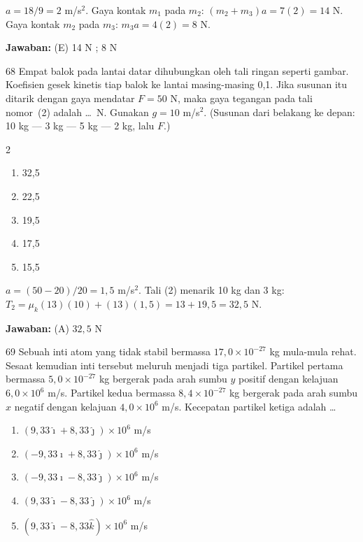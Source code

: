 \documentclass[11pt]{article}
\newenvironment{pil}{%
  \begin{enumerate}[label=(\Alph*),leftmargin=*,itemsep=1pt,topsep=3pt]}%
  {\end{enumerate}}
\newenvironment{pilB}{%
  \par\smallskip\begin{multicols}{2}
  \begin{enumerate}[label=(\Alph*),leftmargin=*,itemsep=1pt,topsep=3pt]}%
  {\end{enumerate}\end{multicols}}
\newcommand{\jawaban}[1]{%
  \noindent\colorbox{gold!30}{\parbox{\dimexpr\linewidth-2\fboxsep\relax}{%
    \textbf{Jawaban:} #1}}\par\smallskip}
\begin{document}
\begin{pembox}
$a=18/9=2$ m/s$^2$. Gaya kontak $m_1$ pada $m_2$: $(m_2+m_3)a=7(2)=14$ N. Gaya kontak $m_2$ pada $m_3$: $m_3 a=4(2)=8$ N.
\jawaban{(E) 14 N ; 8 N}
\end{pembox}

\begin{soal}{68}
Empat balok pada lantai datar dihubungkan oleh tali ringan seperti gambar.
Koefisien gesek kinetis tiap balok ke lantai masing-masing 0,1. Jika
susunan itu ditarik dengan gaya mendatar $F=50$ N, maka gaya tegangan
pada tali nomor~(2) adalah \ldots\ N. Gunakan $g=10$ m/s$^2$. (Susunan
dari belakang ke depan: 10 kg --- 3 kg --- 5 kg --- 2 kg, lalu $F$.)
\begin{pilB}
  \item 32,5 \item 22,5 \item 19,5 \item 17,5 \item 15,5
\end{pilB}
\end{soal}

\begin{pembox}
$a=(50-20)/20=1{,}5$ m/s$^2$. Tali (2) menarik 10 kg dan 3 kg: $T_2=\mu_k(13)(10)+(13)(1{,}5)=13+19{,}5=32{,}5$ N.
\jawaban{(A) $32{,}5$ N}
\end{pembox}

\begin{soal}{69}
Sebuah inti atom yang tidak stabil bermassa $17{,}0\times10^{-27}$ kg
mula-mula rehat. Sesaat kemudian inti tersebut meluruh menjadi tiga
partikel. Partikel pertama bermassa $5{,}0\times10^{-27}$ kg bergerak
pada arah sumbu $y$ positif dengan kelajuan $6{,}0\times10^{6}$ m/s.
Partikel kedua bermassa $8{,}4\times10^{-27}$ kg bergerak pada arah
sumbu $x$ negatif dengan kelajuan $4{,}0\times10^{6}$ m/s. Kecepatan
partikel ketiga adalah \ldots
\begin{pil}
  \item $(9{,}33\hat{\imath}+8{,}33\hat{\jmath})\times10^6$ m/s
  \item $(-9{,}33\hat{\imath}+8{,}33\hat{\jmath})\times10^6$ m/s
  \item $(-9{,}33\hat{\imath}-8{,}33\hat{\jmath})\times10^6$ m/s
  \item $(9{,}33\hat{\imath}-8{,}33\hat{\jmath})\times10^6$ m/s
  \item $(9{,}33\hat{\imath}-8{,}33\hat{k})\times10^6$ m/s
\end{pil}
\end{soal}
\end{document}
